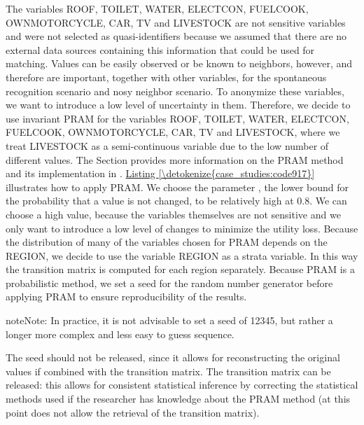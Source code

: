 \documentclass[letterpaper,10pt,english]{sphinxmanual}
\begin{document}
The variables ROOF, TOILET, WATER, ELECTCON, FUELCOOK, OWNMOTORCYCLE,
CAR, TV and LIVESTOCK are not sensitive variables and were not selected
as quasi-identifiers because we assumed that there are no external data
sources containing this information that could be used for matching.
Values can be easily observed or be known to neighbors, however, and
therefore are important, together with other variables, for the
spontaneous recognition scenario and nosy neighbor scenario. To
anonymize these variables, we want to introduce a low level of
uncertainty in them. Therefore, we decide to use invariant PRAM for the
variables ROOF, TOILET, WATER, ELECTCON, FUELCOOK, OWNMOTORCYCLE, CAR,
TV and LIVESTOCK, where we treat LIVESTOCK as a semi-continuous variable
due to the low number of different values.
The Section  provides more
information on the PRAM method and its implementation in .
\hyperref[\detokenize{case_studies:code917}]{Listing \ref{\detokenize{case_studies:code917}}} illustrates how to apply PRAM. We choose the parameter
, the lower bound for the probability that a value is not changed,
to be relatively high at 0.8. We can choose a high value, because the
variables themselves are not sensitive and we only want to introduce a
low level of changes to minimize the utility loss. Because the
distribution of many of the variables chosen for PRAM depends on the
REGION, we decide to use the variable REGION as a strata variable. In
this way the transition matrix is computed for each region separately.
Because PRAM is a probabilistic method, we set a seed for the random
number generator before applying PRAM to ensure reproducibility of the
results.

\begin{sphinxadmonition}{note}{Note:}
In practice, it is not advisable to set a seed of
12345, but rather a longer more complex and less easy to guess
sequence.
\end{sphinxadmonition}

The seed should not be released, since it allows for
reconstructing the original values if combined with the transition
matrix. The transition matrix can be released: this allows for
consistent statistical inference by correcting the statistical methods
used if the researcher has knowledge about the PRAM method (at this
point  does not allow the retrieval of the transition matrix).
\end{document}
